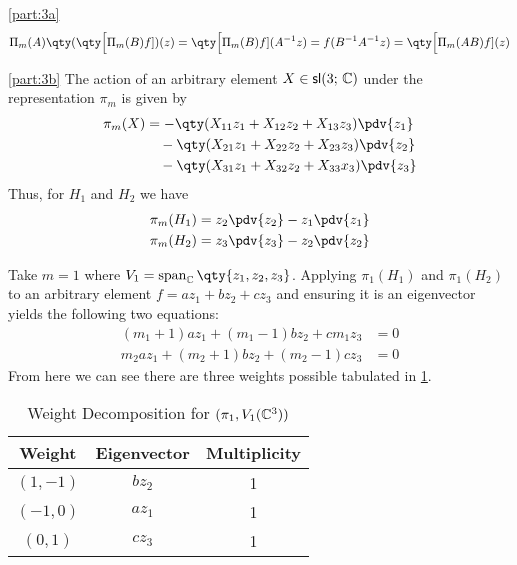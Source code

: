 \documentclass[
	pages,
	boxes,
	color=WildStrawberry
]{homework}
\begin{document}
\begin{solution}
	\ref{part:3a}
	\begin{equation*}
		\Pi_m(A)\qty(\qty\Big[\Pi_m(B)f])(z) = \qty\Big[\Pi_m(B)f](A^{-1}z) = f(B^{-1}A^{-1}z) = \qty\Big[\Pi_m(AB)f](z)
	\end{equation*}

	\ref{part:3b}
	The action of an arbitrary element $X\in\mathsf{sl}(3;\, \mathbb{C})$ under the representation $\pi_m$ is given by
	\begin{align*}
		\pi_m(X) & = -\qty(X_{11} z_1 + X_{12}z_2 + X_{13}z_3)\pdv{z_1}    \\
		         & \quad -\qty(X_{21}z_1 + X_{22}z_2 + X_{23}z_3)\pdv{z_2} \\
		         & \quad -\qty(X_{31}z_1 + X_{32}z_2 + X_{33}x_3)\pdv{z_3}
	\end{align*}
	Thus, for $H_1$ and $H_2$ we have
	\begin{align*}
		\pi_m(H_1) & = z_2\pdv{z_2} - z_1\pdv{z_1} \\
		\pi_m(H_2) & = z_3\pdv{z_3} - z_2\pdv{z_2}
	\end{align*}

	Take $m = 1$ where $V_1 = \vspan_\C\qty{z_1, z_2, z_3}$. Applying $\pi_1(H_1)$ and $\pi_1(H_2)$ to an arbitrary element $f = az_1 + bz_2 + cz_3$ and ensuring it is an eigenvector yields the following two equations:
	\begin{align*}
		(m_1 + 1)az_1 + (m_1 - 1)bz_2 + cm_1z_3 & = 0 \\
		m_2az_1 + (m_2 + 1)bz_2 + (m_2 - 1)cz_3 & = 0
	\end{align*}
	From here we can see there are three weights possible tabulated in \cref{tab:pione}.
	\begin{table}[h]
		\centering\begin{tabular}{c c c}
			Weight    & Eigenvector & Multiplicity \\ \toprule
			$(1, -1)$ & $bz_2$      & 1            \\
			$(-1, 0)$ & $az_1$      & 1            \\
			$(0, 1)$  & $cz_3$      & 1
		\end{tabular}
		\caption{Weight Decomposition for $(\pi_1, V_1(\mathbb{C}^3))$}\label{tab:pione}
	\end{table}


\end{solution}
\end{document}
